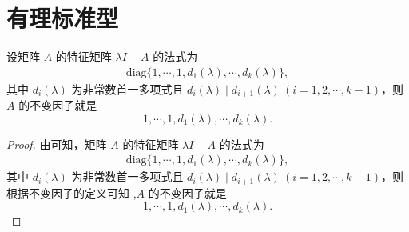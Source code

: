 \documentclass[../../main.tex]{subfiles}
\begin{document}
\section{有理标准型}\label{section:有理标准型}

\begin{proposition}\label{proposition:特征矩阵的法式和不变因子}
设矩阵 $A$ 的特征矩阵 $\lambda I - A$ 的法式为
\begin{align*}
\mathrm{diag}\{1,\cdots,1,d_1(\lambda),\cdots,d_k(\lambda)\},
\end{align*}
其中 $d_i(\lambda)$ 为非常数首一多项式且 $d_i(\lambda)\mid d_{i + 1}(\lambda)\ (i = 1, 2, \cdots, k - 1)$，则 $A$ 的不变因子就是
\[
1,\cdots,1,d_1(\lambda),\cdots,d_k(\lambda).
\] 
\end{proposition}
\begin{proof}
由可知，矩阵 $A$ 的特征矩阵 $\lambda I - A$ 的法式为
\begin{align*}
\mathrm{diag}\{1,\cdots,1,d_1(\lambda),\cdots,d_k(\lambda)\},
\end{align*}
其中 $d_i(\lambda)$ 为非常数首一多项式且 $d_i(\lambda)\mid d_{i + 1}(\lambda)\ (i = 1, 2, \cdots, k - 1)$，则根据不变因子的定义可知 ,$A$ 的不变因子就是
\[
1,\cdots,1,d_1(\lambda),\cdots,d_k(\lambda).
\] 
\end{proof}
\end{document}
